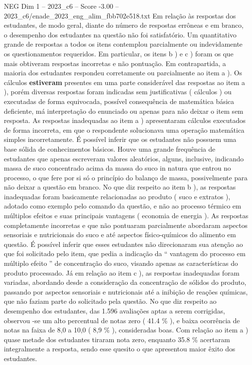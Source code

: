 \begin{textsample}{NEG Dim 1 – 2023\_c6 – Score -3.00 – 2023\_c6/enade\_2023\_eng\_alim\_fbb702e518.txt}
Em relação às respostas dos estudantes, de modo geral, diante do número de respostas errôneas e em branco, o desempenho dos estudantes na questão não foi satisfatório.
Um quantitativo grande de respostas a todos os itens contemplou parcialmente ou indevidamente os questionamentos requeridos.
Em particular, os itens b ) e c ) foram os que mais obtiveram respostas incorretas e não pontuação.
Em contrapartida, a maioria dos estudantes respondeu corretamente ou parcialmente ao item a ).
Os cálculos \textbf{estiveram} presentes em uma parte considerável das respostas ao item a ), porém diversas respostas foram indicadas sem justificativas ( cálculos ) ou executadas de forma equivocada, possível consequência de matemática básica deficiente, má interpretação do enunciado ou apenas para não deixar o item sem resposta.
As respostas inadequadas ao item a ) apresentaram cálculos executados de forma incorreta, em que o respondente solucionava uma operação matemática simples incorretamente.
É possível inferir que os estudantes não possuem uma base sólida de conhecimentos básicos.
Houve uma grande frequência de estudantes que apenas escreveram valores aleatórios, alguns, inclusive, indicando massa de suco concentrado acima da massa do suco in natura que entrou no processo, o que fere por si só o princípio do balanço de massa, possivelmente para não deixar a questão em branco.
No que diz respeito ao item b ), as respostas inadequadas foram basicamente relacionadas ao produto ( suco e extratos ), adotado como exemplo pelo comando da questão, e não ao processo térmico em múltiplos efeitos e suas principais vantagens ( economia de energia ).
As respostas completamente incorretas e que não pontuaram parcialmente abordaram aspectos sensoriais e nutricionais do suco e até aspectos físico-químicos do alimento em questão.
É possível inferir que esses estudantes não direcionaram sua atenção ao que foi solicitado pelo item, que pedia a indicação da “ vantagem do processo em múltiplo efeito ” de concentração do suco, visando apenas as características do produto processado.
Já em relação ao item c ), as respostas inadequadas foram variadas, abordando desde a consideração da concentração de sólidos do produto, passando por aspectos sensoriais e nutricionais até a inibição de reações químicas, que não faziam parte do solicitado pela questão.
No que diz respeito ao desempenho dos estudantes, das 1.596 avaliações aptas a serem corrigidas, observou -se um alto percentual de notas zero ( 41.4 \% ), e baixa ocorrência de notas na faixa de 8,0 a 10,0 ( 8,9 \% ), consideradas boas.
Com relação ao item a ) quase metade dos estudantes tiraram nota zero, enquanto 35.8 \% acertaram integralmente a resposta, sendo esse quesito o que apresentou maior êxito dos estudantes.

\end{textsample}
